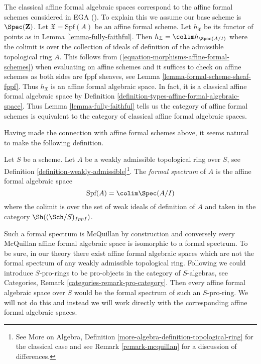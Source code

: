\begin{remark}
\label{remark-compare-with-affine-formal-schemes}
The classical affine formal algebraic spaces correspond to the
affine formal schemes considered in EGA (\cite{EGA}). To explain this
we assume our base scheme is $\Spec(\mathbf{Z})$. Let
$\mathfrak X = \text{Spf}(A)$ be an affine formal scheme.
Let $h_\mathfrak X$ be its functor of points as in
Lemma \ref{lemma-fully-faithful}.
Then $h_\mathfrak X = \colim h_{\Spec(A/I)}$ where the colimit
is over the collection of ideals of definition of the admissible
topological ring $A$. This follows from
(\ref{equation-morphisms-affine-formal-schemes})
when evaluating on affine schemes and it suffices to check
on affine schemes as both sides are fppf sheaves, see
Lemma \ref{lemma-formal-scheme-sheaf-fppf}.
Thus $h_\mathfrak X$ is an affine formal algebraic space.
In fact, it is a classical affine formal algebraic space
by Definition \ref{definition-types-affine-formal-algebraic-space}.
Thus Lemma \ref{lemma-fully-faithful} tells us
the category of affine formal schemes is equivalent to the category
of classical affine formal algebraic spaces.
\end{remark}

\noindent
Having made the connection with affine formal schemes above,
it seems natural to make the following definition.

\begin{definition}
\label{definition-affine-formal-spectrum}
Let $S$ be a scheme. Let $A$ be a weakly admissible topological ring over
$S$, see Definition \ref{definition-weakly-admissible}\footnote{See
More on Algebra, Definition
\ref{more-algebra-definition-topological-ring}
for the classical case and see Remark \ref{remark-mcquillan}
for a discussion of differences.}.
The {\it formal spectrum} of $A$ is the affine formal algebraic space
$$
\text{Spf}(A) = \colim \Spec(A/I)
$$
where the colimit is over the set of weak ideals of definition of $A$
and taken in the category $\Sh((\Sch/S)_{fppf})$.
\end{definition}

\noindent
Such a formal spectrum is McQuillan by construction and conversely
every McQuillan affine formal algebraic space is isomorphic to a
formal spectrum. To be sure, in our theory there exist affine formal
algebraic spaces which are not the formal spectrum of any
weakly admissible topological ring.
Following \cite{Yasuda} we could introduce $S$-pro-rings
to be pro-objects in the category of $S$-algebras, see Categories,
Remark \ref{categories-remark-pro-category}. Then every
affine formal algebraic space over $S$ would be the formal spectrum of such
an $S$-pro-ring. We will not do this and instead we will work directly with the
corresponding affine formal algebraic spaces.

